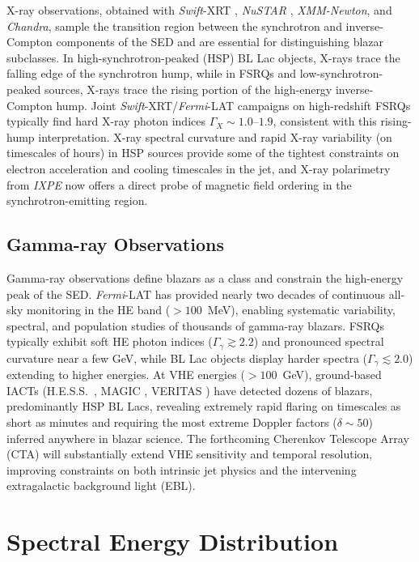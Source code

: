 \documentclass[11pt]{article}
\begin{document}
X-ray observations, obtained with \textit{Swift}-XRT \cite{Gehrels2004}, \textit{NuSTAR} \cite{Harrison2013}, \textit{XMM-Newton}, and \textit{Chandra}, sample the transition region between the synchrotron and inverse-Compton components of the SED and are essential for distinguishing blazar subclasses. In high-synchrotron-peaked (HSP) BL Lac objects, X-rays trace the falling edge of the synchrotron hump, while in FSRQs and low-synchrotron-peaked sources, X-rays trace the rising portion of the high-energy inverse-Compton hump. Joint \textit{Swift}-XRT/\textit{Fermi}-LAT campaigns on high-redshift FSRQs typically find hard X-ray photon indices $\Gamma_X \sim 1.0$--$1.9$, consistent with this rising-hump interpretation. X-ray spectral curvature and rapid X-ray variability (on timescales of hours) in HSP sources provide some of the tightest constraints on electron acceleration and cooling timescales in the jet, and X-ray polarimetry from \textit{IXPE} now offers a direct probe of magnetic field ordering in the synchrotron-emitting region.

\subsection{Gamma-ray Observations}

Gamma-ray observations define blazars as a class and constrain the high-energy peak of the SED. \textit{Fermi}-LAT \cite{Atwood2009} has provided nearly two decades of continuous all-sky monitoring in the HE band ($>100$~MeV), enabling systematic variability, spectral, and population studies of thousands of gamma-ray blazars. FSRQs typically exhibit soft HE photon indices ($\Gamma_\gamma \gtrsim 2.2$) and pronounced spectral curvature near a few GeV, while BL Lac objects display harder spectra ($\Gamma_\gamma \lesssim 2.0$) extending to higher energies. At VHE energies ($>100$~GeV), ground-based IACTs (H.E.S.S.\ \cite{Hinton2004}, MAGIC \cite{Aleksic2016}, VERITAS \cite{Holder2006}) have detected dozens of blazars, predominantly HSP BL Lacs, revealing extremely rapid flaring on timescales as short as minutes and requiring the most extreme Doppler factors ($\delta \sim 50$) inferred anywhere in blazar science. The forthcoming Cherenkov Telescope Array (CTA) will substantially extend VHE sensitivity and temporal resolution, improving constraints on both intrinsic jet physics and the intervening extragalactic background light (EBL).

\section{Spectral Energy Distribution}
\end{document}
